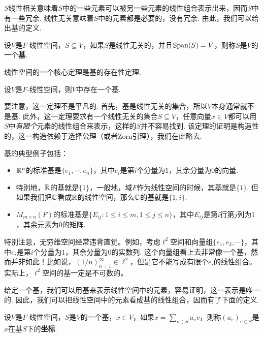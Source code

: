 $S$线性相关意味着$S$中的一些元素可以被另一些元素的线性组合表示出来，因而$S$中有一些冗余. 线性无关意味着$S$中的元素都是必要的，没有冗余. 由此，我们可以给出基的定义. 

\begin{definition}[基]
设$V$是$F$-线性空间，$S\subseteq V$，如果$S$是线性无关的，并且$\operatorname*{Span}(S)=V$，则称$S$是$V$的一个\textbf{基}. 
\end{definition}

线性空间的一个核心定理是基的存在性定理. 

\begin{theorem}[基的存在性定理]\label{thm:existence-of-basis}
设$V$是$F$-线性空间，则$V$中存在一个基. 
\end{theorem}

要注意，这一定理不是平凡的. 首先，基是线性无关的集合，所以$V$本身通常就不是基. 此外，这一定理要求有一个线性无关的集合$S\subseteq V$，任意向量$x\in V$都可以用$S$中\emph{有限个}元素的线性组合来表示，这样的$S$并不容易找到. 该定理的证明是构造性的，这一构造依赖于选择公理（或者Zorn引理），我们在此略去. 

基的典型例子包括：
\begin{itemize}
    \item $\mathbb{R}^n$的标准基是$\{e_1,\cdots,e_n\}$，其中$e_i$是第$i$个分量为$1$，其余分量为$0$的向量. 
    \item 特别地，$\mathbb{R}$的基就是$\{1\}$，一般地，域$F$作为线性空间的时候，其基就是$\{1\}$. 但如果我们把$\mathbb{C}$看成$\mathbb{R}$的线性空间，那么$\mathbb{C}$的基就是$\{1,i\}$.
    \item $M_{m\times n}(F)$的标准基是$\{E_{ij}:1\leq i\leq m,1\leq j\leq n\}$，其中$E_{ij}$是第$i$行第$j$列为$1$，其余元素为$0$的矩阵. 
\end{itemize}

特别注意，无穷维空间经常违背直觉。例如，考虑$\ell^2$空间和向量组$\{e_1,e_2,\cdots\}$，其中$e_i$是第$i$个分量为$1$，其余分量为$0$的实数列. 这个向量组看上去非常像一个基，然而并非如此！比如说，$(1/n)_{n=1}^\infty\in\ell^2$，但是它不能写成有限个$e_i$的线性组合。实际上，$\ell^2$空间的基一定是不可数的。

给定一个基，我们可以用基来表示线性空间中的元素，容易证明，这一表示是唯一的. 因此，我们可以把线性空间中的元素看成基的线性组合，因而有了下面的定义. 

\begin{definition}[坐标]
设$V$是$F$-线性空间，$S$是$V$的一个基，$x\in V$，如果$x=\sum_{v\in S} a_v v$，则称$(a_v)_{v\in S}$是$x$在基$S$下的\textbf{坐标}. 
\end{definition}

